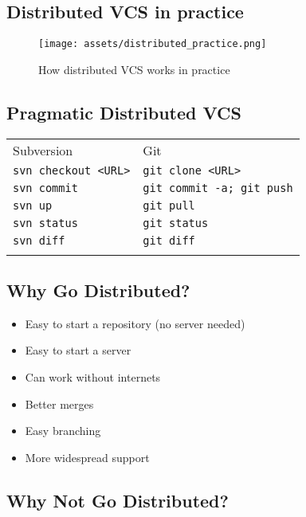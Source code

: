 \documentclass[]{scrartcl}
\makeatletter
\def\maxwidth{\ifdim\Gin@nat@width>\linewidth\linewidth
\else\Gin@nat@width\fi}
\let\Oldincludegraphics\includegraphics
\renewcommand{\includegraphics}[1]{\Oldincludegraphics[width=\maxwidth]{#1}}
\makeatother
\begin{document}
\subsection{Distributed VCS in
practice}\label{distributed-vcs-in-practice}

\begin{figure}[htbp]
\centering
\texttt{[image: assets/distributed\_practice.png]}
\caption{How distributed VCS works in practice}
\end{figure}

\subsection{Pragmatic Distributed VCS}\label{pragmatic-distributed-vcs}

\begin{longtable}[c]{@{}ll@{}}
\hline\noalign{\medskip}
Subversion & Git
\\\noalign{\medskip}
\hline\noalign{\medskip}
\texttt{svn checkout \textless{}URL\textgreater{}} &
\texttt{git clone \textless{}URL\textgreater{}}
\\\noalign{\medskip}
\texttt{svn commit} & \texttt{git commit -a; git push}
\\\noalign{\medskip}
\texttt{svn up} & \texttt{git pull}
\\\noalign{\medskip}
\texttt{svn status} & \texttt{git status}
\\\noalign{\medskip}
\texttt{svn diff} & \texttt{git diff}
\\\noalign{\medskip}
\hline
\end{longtable}

\subsection{Why Go Distributed?}\label{why-go-distributed}

\begin{itemize}
\itemsep1pt\parskip0pt
\item
  Easy to start a repository (no server needed)
\item
  Easy to start a server
\item
  Can work without internets
\item
  Better merges
\item
  Easy branching
\item
  More widespread support
\end{itemize}

\subsection{Why Not Go Distributed?}\label{why-not-go-distributed}
\end{document}
